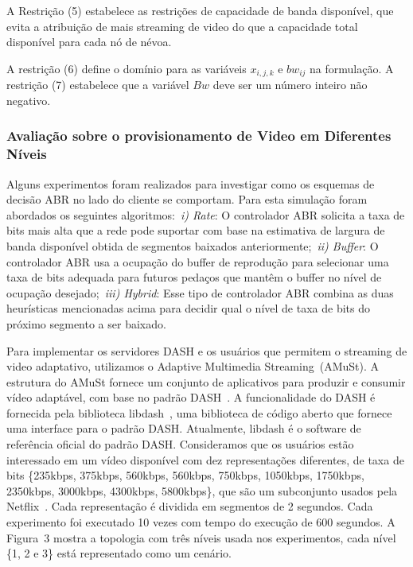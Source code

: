 A Restrição (5) estabelece as restrições de capacidade de banda disponível, que evita a atribuição de mais streaming de video do que a capacidade total disponível para cada nó de névoa.

A restrição (6) define o domínio para as variáveis $x_{i, j, k}$ e $bw_{ij}$ na formulação. A restrição (7) estabelece que a variável $Bw$ deve ser um número inteiro não negativo.

\subsubsection{Avaliação sobre o provisionamento de Video em Diferentes Níveis}
\label{subsec:evaluation}

Alguns experimentos foram realizados para investigar como os esquemas de decisão ABR no lado do cliente se comportam. Para esta simulação foram abordados os seguintes algoritmos:~\textit{i) Rate}: O controlador ABR solicita a taxa de bits mais alta
que a rede pode suportar com base na estimativa de largura de banda disponível obtida de segmentos baixados anteriormente;~\textit{ii) Buffer}: O controlador ABR usa a ocupação do buffer de reprodução para selecionar uma taxa de bits adequada para futuros pedaços que mantêm o buffer no nível de ocupação desejado;~\textit{iii) Hybrid}: Esse tipo de controlador ABR combina as duas heurísticas mencionadas acima para decidir qual o nível de taxa de bits do próximo segmento a ser baixado.


Para implementar os servidores DASH e os usuários que permitem o streaming de video adaptativo, utilizamos o Adaptive Multimedia Streaming~(AMuSt).
A estrutura do AMuSt fornece um conjunto de aplicativos para produzir e consumir vídeo adaptável, com base no padrão DASH~\cite{kreuzberger2016amust}. A funcionalidade do DASH é fornecida pela biblioteca libdash~\cite{mueller2013ICMEW}, uma biblioteca de código aberto que fornece uma interface para o padrão DASH. Atualmente, libdash é o software de referência oficial do padrão DASH.
Consideramos que os usuários estão interessado em um vídeo disponível com dez representações diferentes, de taxa de bits \{235kbps, 375kbps, 560kbps, 560kbps, 750kbps, 1050kbps, 1750kbps, 2350kbps, 3000kbps, 4300kbps, 5800kbps\}, que são um subconjunto usados pela Netflix~\cite{netflix:representation}.
Cada representação é dividida em segmentos de 2 segundos. Cada experimento foi executado 10 vezes com tempo do execução de 600 segundos. A Figura~3 mostra a topologia com três níveis usada nos experimentos, cada nível \{1, 2 e 3\} está representado como um cenário.  

